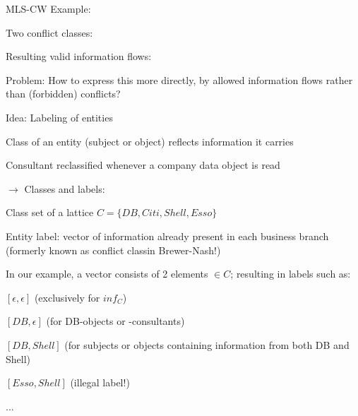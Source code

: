 \documentclass[a4paper]{article}
\begin{document}
\begin{multicols}{3}
    MLS-CW Example:
    \begin{itemize*}
        \item Two conflict classes: %
        \item Resulting valid information flows: %
        \item Problem: How to express this more directly, by allowed information flows rather than (forbidden) conflicts?
    \end{itemize*}

    Idea: Labeling of entities
    \begin{itemize*}
        \item Class of an entity (subject or object) reflects information it carries
        \item Consultant reclassified whenever a company data object is read
        \item $\rightarrow$ Classes and labels:
        \item Class set of a lattice $C=\{DB,Citi,Shell,Esso\}$
        \item Entity label: vector of information already present in each business branch (formerly known as conflict classin Brewer-Nash!)
        \item In our example, a vector consists of 2 elements $\in C$; resulting in labels such as:
              \begin{itemize*}
                  \item $[\epsilon,\epsilon]$ (exclusively for $inf_C$)
                  \item $[DB,\epsilon]$ (for DB-objects or -consultants)
                  \item $[DB,Shell]$ (for subjects or objects containing information from both DB and Shell)
                  \item $[Esso,Shell]$ (illegal label!)
                  \item ...
              \end{itemize*}
    \end{itemize*}


\end{multicols}
\end{document}
